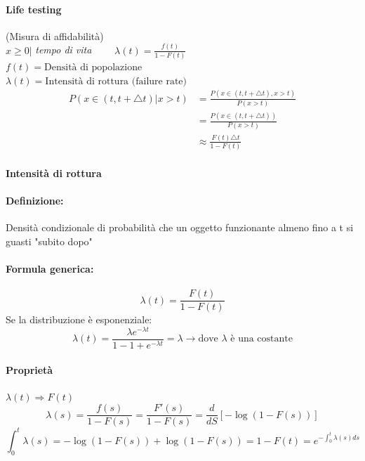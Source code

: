 \documentclass[]{article}
\newcommand{\definizione}{\paragraph{Definizione:}}
\newcommand{\formula}{\paragraph{Formula generica:}}
\begin{document}
    \paragraph{Life testing} (Misura di affidabilità) \\
    $x \geq 0 \rvert$ \textit{tempo di vita} $\qquad \lambda(t) = \frac{f(t)}{1- F(t)}$ \\
    $f(t) = \text{Densità di popolazione}$ \\
    $\lambda(t) = \text{Intensità di rottura (failure rate)}$
    \begin{equation*}
        \begin{split}
            P(x \in (t, t + \triangle t) \rvert x > t) &= \frac{P(x \in (t, t + \triangle t), x > t)}{P(x > t)} \\
            &= \frac{P(x \in (t, t + \triangle t))}{P(x > t)} \\
            &\approx \frac{F(t) \triangle t}{1-F(t)}
        \end{split}
    \end{equation*}
    \paragraph{Intensità di rottura} 
    \definizione Densità condizionale di probabilità che un oggetto funzionante almeno fino a t si guasti "subito dopo"
    \formula \[ \lambda(t) = \frac{F(t)}{1 - F(t)} \] 
    Se la distribuzione è esponenziale:
    \[ \lambda(t) = \frac{\lambda e^{-\lambda t}}{1 - 1 + e^{-\lambda t}} = \lambda \rightarrow \text{dove $\lambda$ è una costante}\]
    \paragraph{Proprietà} $\lambda(t) \Rightarrow F(t)$
    \[ \lambda(s) = \frac{f(s)}{1 - F(s)} = \frac{F'(s)}{1 - F(s)} = \frac{d}{dS} [ - \log (1 - F(s))] \]
    \[ \int_{0}^{t} \lambda(s) = -\log (1-F(s)) + \log (1- F(s)) = 1 - F(t) = e^{-\int_{0}^{t} \lambda(s) ds}\]
\end{document}
